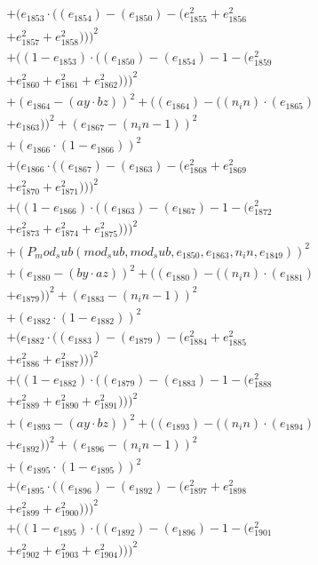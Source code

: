 \documentclass[10pt, a4paper]{article}
\begin{document}
\begin{small}
\begin{align*}
& + (e_{1853}  \cdot  ((e_{1854}) - (e_{1850}) - (e_{1855}^{2} + e_{1856}^{2} \\
& + e_{1857}^{2} + e_{1858}^{2})))^{2} \\
& + ((1 - e_{1853})  \cdot  ((e_{1850}) - (e_{1854}) - 1 - (e_{1859}^{2} \\
& + e_{1860}^{2} + e_{1861}^{2} + e_{1862}^{2})))^{2} \\
& + (e_{1864} - (ay  \cdot  bz))^{2} + ((e_{1864}) - ((n_in)  \cdot  (e_{1865}) \\
& + e_{1863}))^{2} + (e_{1867} - (n_in - 1))^{2} \\
& + (e_{1866}  \cdot  (1 - e_{1866}))^{2} \\
& + (e_{1866}  \cdot  ((e_{1867}) - (e_{1863}) - (e_{1868}^{2} + e_{1869}^{2} \\
& + e_{1870}^{2} + e_{1871}^{2})))^{2} \\
& + ((1 - e_{1866})  \cdot  ((e_{1863}) - (e_{1867}) - 1 - (e_{1872}^{2} \\
& + e_{1873}^{2} + e_{1874}^{2} + e_{1875}^{2})))^{2} \\
& + (P_mod_sub(mod_sub, mod_sub, e_{1850}, e_{1863}, n_in, e_{1849}))^{2} \\
& + (e_{1880} - (by  \cdot  az))^{2} + ((e_{1880}) - ((n_in)  \cdot  (e_{1881}) \\
& + e_{1879}))^{2} + (e_{1883} - (n_in - 1))^{2} \\
& + (e_{1882}  \cdot  (1 - e_{1882}))^{2} \\
& + (e_{1882}  \cdot  ((e_{1883}) - (e_{1879}) - (e_{1884}^{2} + e_{1885}^{2} \\
& + e_{1886}^{2} + e_{1887}^{2})))^{2} \\
& + ((1 - e_{1882})  \cdot  ((e_{1879}) - (e_{1883}) - 1 - (e_{1888}^{2} \\
& + e_{1889}^{2} + e_{1890}^{2} + e_{1891}^{2})))^{2} \\
& + (e_{1893} - (ay  \cdot  bz))^{2} + ((e_{1893}) - ((n_in)  \cdot  (e_{1894}) \\
& + e_{1892}))^{2} + (e_{1896} - (n_in - 1))^{2} \\
& + (e_{1895}  \cdot  (1 - e_{1895}))^{2} \\
& + (e_{1895}  \cdot  ((e_{1896}) - (e_{1892}) - (e_{1897}^{2} + e_{1898}^{2} \\
& + e_{1899}^{2} + e_{1900}^{2})))^{2} \\
& + ((1 - e_{1895})  \cdot  ((e_{1892}) - (e_{1896}) - 1 - (e_{1901}^{2} \\
& + e_{1902}^{2} + e_{1903}^{2} + e_{1904}^{2})))^{2} \\

\end{align*}
\end{small}
\end{document}
